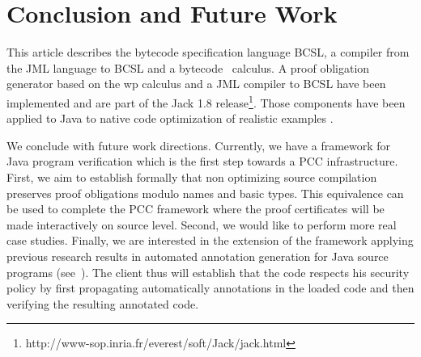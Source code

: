 \section{Conclusion and Future Work}\label{conclusion}
This article describes the bytecode specification language BCSL, a compiler from the JML language to BCSL and a bytecode \wpi \ calculus.
A proof obligation generator based on the wp calculus and a JML compiler to BCSL have been implemented and are part of the Jack 1.8 release\footnote{http://www-sop.inria.fr/everest/soft/Jack/jack.html}. Those components have been applied to Java to native code optimization of realistic examples \cite{CPG06LFN}.  


 We conclude with future work directions. 
Currently, we have a framework for Java program verification which is the first step towards a PCC infrastructure.
 First, we aim to establish formally that non optimizing source compilation
preserves proof obligations modulo names and basic types. This equivalence can
 be used to complete the PCC framework where the proof certificates will be made interactively on source level. Second, we would like to perform more real case studies. 
Finally, we are interested in 
the extension of the framework applying previous research results in automated annotation generation for Java source programs
 (see~\cite{PBBHL}). The client thus will establish that the code respects his security policy %
by first propagating automatically annotations in the loaded code and then verifying the resulting annotated code.





